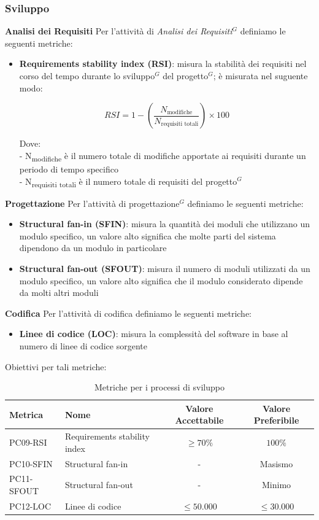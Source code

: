 \documentclass[a4paper,10pt]{article}
\begin{document}
\subsubsection{Sviluppo}
\textbf{Analisi dei Requisiti} Per l'attività di \textit{Analisi dei Requisiti$^G$} definiamo le seguenti metriche:
\begin{itemize}
    \item \textbf{Requirements stability index (RSI)}: misura la stabilità dei requisiti nel corso del tempo durante lo sviluppo$^G$ del progetto$^G$; è misurata nel suguente modo:
    \begin{center}
        \[
        RSI = 1 - \left( \frac{N_{\text{modifiche}}}{N_{\text{requisiti totali}}} \right) \times 100
        \]
    \end{center}
    Dove: \\
    - N\textsubscript{modifiche} è il numero totale di modifiche apportate ai requisiti durante un periodo di tempo specifico \\
    - N\textsubscript{requisiti totali} è il numero totale di requisiti del progetto$^G$
\end{itemize}
\textbf{Progettazione} Per l'attività di progettazione$^G$ definiamo le seguenti metriche:
\begin{itemize}
    \item \textbf{Structural fan-in (SFIN)}: misura la quantità dei moduli che utilizzano un modulo specifico, un valore alto significa che molte parti del sistema dipendono da un modulo in particolare
    \item \textbf{Structural fan-out (SFOUT)}: misura il numero di moduli utilizzati da un modulo specifico, un valore alto significa che il modulo considerato dipende da molti altri moduli
\end{itemize}
\textbf{Codifica} Per l'attività di codifica definiamo le seguenti metriche:
\begin{itemize}
    \item \textbf{Linee di codice (LOC)}: misura la complessità del software in base al numero di linee di codice sorgente
\end{itemize}
Obiettivi per tali metriche:
\begin{table}[H]
\centering
\renewcommand{\arraystretch}{1.2}
\begin{tabular}{|l|l|c|c|}
\hline
\textbf{Metrica} & \textbf{Nome} & \textbf{Valore Accettabile} & \textbf{Valore Preferibile} \\
\hline
PC09-RSI & Requirements stability index & $\geq 70\%$ & $100\%$ \\
PC10-SFIN  & Structural fan-in           & -      & Masismo \\
PC11-SFOUT  & Structural fan-out            & -      & Minimo \\
PC12-LOC  & Linee di codice             & $\leq 50.000$      & $\leq 30.000$  \\
\hline
\end{tabular}
\caption{Metriche per i processi di sviluppo}
\label{tab:metriche-sviluppo}
\end{table}
\end{document}
